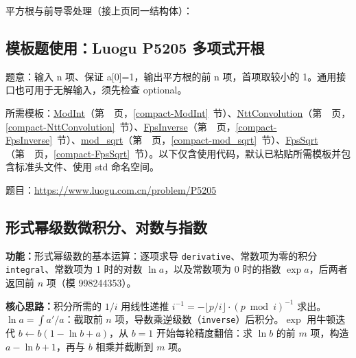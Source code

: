 

\newpage

\noindent 平方根与前导零处理（接上页同一结构体）：



\newpage

\Needspace{404pt}

\subsection*{模板题使用：Luogu P5205 多项式开根}

\label{usage-example-117}

题意：输入 n 项、保证 a[0]=1，输出平方根的前 n 项，首项取较小的 1。通用接口也可用于无解输入，须先检查 optional。

所需模板：\hyperref[compact-ModInt]{ModInt}（第~\pageref{compact-ModInt}~页，\ref{compact-ModInt}~节）、\hyperref[compact-NttConvolution]{NttConvolution}（第~\pageref{compact-NttConvolution}~页，\ref{compact-NttConvolution}~节）、\hyperref[compact-FpsInverse]{FpsInverse}（第~\pageref{compact-FpsInverse}~页，\ref{compact-FpsInverse}~节）、\hyperref[compact-mod_sqrt]{mod\_\allowbreak{}sqrt}（第~\pageref{compact-mod_sqrt}~页，\ref{compact-mod_sqrt}~节）、\hyperref[compact-FpsSqrt]{FpsSqrt}（第~\pageref{compact-FpsSqrt}~页，\ref{compact-FpsSqrt}~节）。以下仅含使用代码，默认已粘贴所需模板并包含标准头文件、使用 std 命名空间。

题目：\url{https://www.luogu.com.cn/problem/P5205}



\subsection{形式幂级数微积分、对数与指数}\label{compact-FpsFunctions}

\noindent\textbf{功能：}\allowbreak 形式幂级数的基本运算：逐项求导 \texttt{derivative}、常数项为零的积分 \texttt{integral}、常数项为 1 时的对数 $\ln a$，以及常数项为 0 时的指数 $\exp a$，后两者返回前 $n$ 项（模 998244353）。

\textbf{核心思路：}\allowbreak 积分所需的 $1/i$ 用线性递推 $i^{-1}=-\lfloor p/i\rfloor\cdot(p\bmod i)^{-1}$ 求出。$\ln a=\int a'/a$：截取前 $n$ 项，导数乘逆级数（\texttt{inverse}）后积分。$\exp$ 用牛顿迭代 $b\leftarrow b(1-\ln b+a)$，从 $b=1$ 开始每轮精度翻倍：求 $\ln b$ 的前 $m$ 项，构造 $a-\ln b+1$，再与 $b$ 相乘并截断到 $m$ 项。

